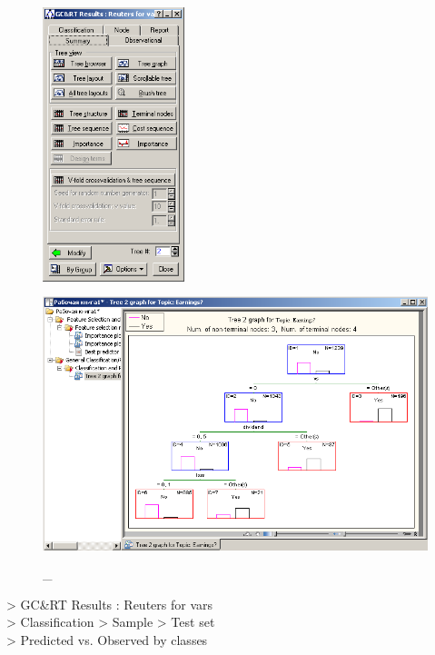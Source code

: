 \begin{figure}[!h]
  \centering

  \begin{minipage}{0.29\textwidth}
    \centering

    \includegraphics[height=8cm]
    {inc/var5/31.PNG}

    \caption{\_}

    \label{fig:var5_31}
  \end{minipage}
  \begin{minipage}{0.69\textwidth}
    \centering

    \includegraphics[height=8cm]
    {inc/var5/32.PNG}

    \caption{\_}

    \label{fig:var5_32}
  \end{minipage}
\end{figure}

> GC\&RT Results : Reuters for vars \\
> Classification > Sample > Test set \\
> Predicted vs. Observed by classes \\


